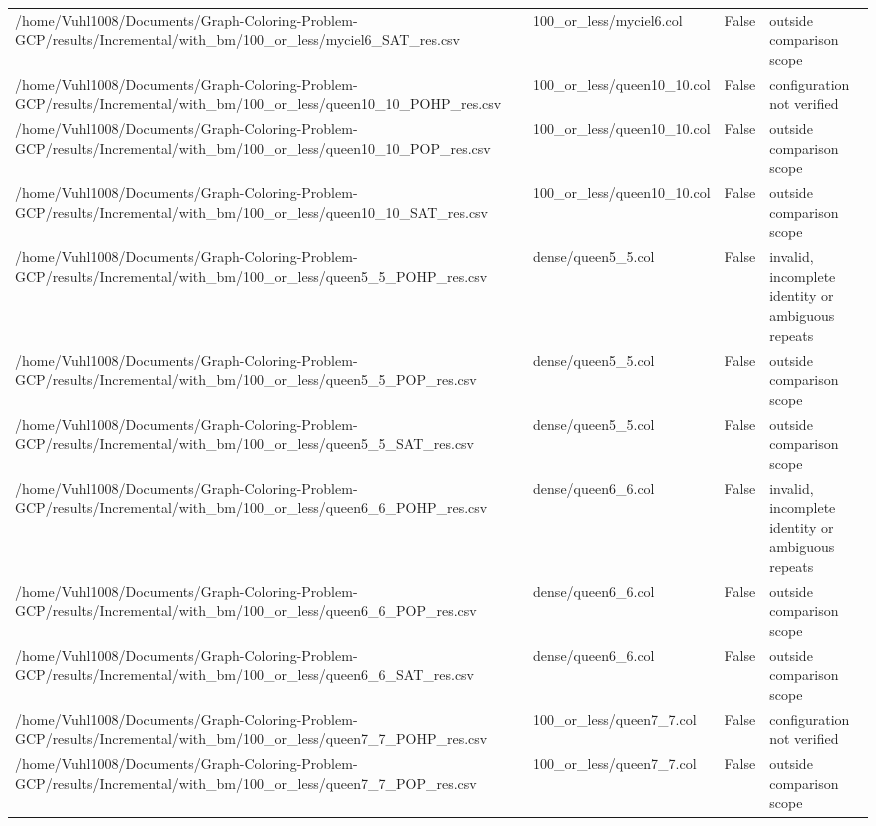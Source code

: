 \begin{table}[htbp]
\begin{tabular}{llll}
/home/Vuhl1008/Documents/Graph-Coloring-Problem-GCP/results/Incremental/with\_bm/100\_or\_less/myciel6\_SAT\_res.csv & 100\_or\_less/myciel6.col & False & outside comparison scope \\
/home/Vuhl1008/Documents/Graph-Coloring-Problem-GCP/results/Incremental/with\_bm/100\_or\_less/queen10\_10\_POHP\_res.csv & 100\_or\_less/queen10\_10.col & False & configuration not verified \\
/home/Vuhl1008/Documents/Graph-Coloring-Problem-GCP/results/Incremental/with\_bm/100\_or\_less/queen10\_10\_POP\_res.csv & 100\_or\_less/queen10\_10.col & False & outside comparison scope \\
/home/Vuhl1008/Documents/Graph-Coloring-Problem-GCP/results/Incremental/with\_bm/100\_or\_less/queen10\_10\_SAT\_res.csv & 100\_or\_less/queen10\_10.col & False & outside comparison scope \\
/home/Vuhl1008/Documents/Graph-Coloring-Problem-GCP/results/Incremental/with\_bm/100\_or\_less/queen5\_5\_POHP\_res.csv & dense/queen5\_5.col & False & invalid, incomplete identity or ambiguous repeats \\
/home/Vuhl1008/Documents/Graph-Coloring-Problem-GCP/results/Incremental/with\_bm/100\_or\_less/queen5\_5\_POP\_res.csv & dense/queen5\_5.col & False & outside comparison scope \\
/home/Vuhl1008/Documents/Graph-Coloring-Problem-GCP/results/Incremental/with\_bm/100\_or\_less/queen5\_5\_SAT\_res.csv & dense/queen5\_5.col & False & outside comparison scope \\
/home/Vuhl1008/Documents/Graph-Coloring-Problem-GCP/results/Incremental/with\_bm/100\_or\_less/queen6\_6\_POHP\_res.csv & dense/queen6\_6.col & False & invalid, incomplete identity or ambiguous repeats \\
/home/Vuhl1008/Documents/Graph-Coloring-Problem-GCP/results/Incremental/with\_bm/100\_or\_less/queen6\_6\_POP\_res.csv & dense/queen6\_6.col & False & outside comparison scope \\
/home/Vuhl1008/Documents/Graph-Coloring-Problem-GCP/results/Incremental/with\_bm/100\_or\_less/queen6\_6\_SAT\_res.csv & dense/queen6\_6.col & False & outside comparison scope \\
/home/Vuhl1008/Documents/Graph-Coloring-Problem-GCP/results/Incremental/with\_bm/100\_or\_less/queen7\_7\_POHP\_res.csv & 100\_or\_less/queen7\_7.col & False & configuration not verified \\
/home/Vuhl1008/Documents/Graph-Coloring-Problem-GCP/results/Incremental/with\_bm/100\_or\_less/queen7\_7\_POP\_res.csv & 100\_or\_less/queen7\_7.col & False & outside comparison scope \\

\end{tabular}
\end{table}
